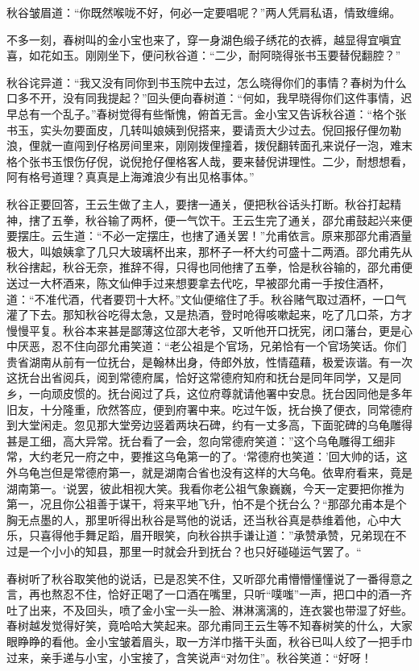 \documentclass[12pt,UTF8]{ctexbook}
\begin{document}
{{{秋谷皱眉道：“你既然喉咙不好，何必一定要唱呢？”两人凭肩私语，情致缠绵。

不多一刻，春树叫的金小宝也来了，穿一身湖色缎子绣花的衣裤，越显得宜嗔宜喜，如花如玉。刚刚坐下，便问秋谷道：“二少，耐阿晓得张书玉要替倪翻腔？”

秋谷诧异道：“我又没有同你到书玉院中去过，怎么晓得你们的事情？春树为什么口多不开，没有同我提起？”回头便向春树道：“何如，我早晓得你们这件事情，迟早总有一个乱子。”春树觉得有些惭愧，俯首无言。金小宝又告诉秋谷道：“格个张书玉，实头勿要面皮，几转叫娘姨到倪搭来，要请贡大少过去。倪回报仔俚勿勒浪，俚就一直闯到仔格房间里来，刚刚拨俚撞着，拨倪翻转面孔来说仔一泡，难末格个张书玉恨伤仔倪，说倪抢仔俚格客人哉，要来替倪讲理性。二少，耐想想看，阿有格号道理？真真是上海滩浪少有出见格事体。”

秋谷正要回答，王云生做了主人，要搳一通关，便把秋谷话头打断。秋谷打起精神，搳了五拳，秋谷输了两杯，便一气饮干。王云生完了通关，邵允甫鼓起兴来便要摆庄。云生道：“不必一定摆庄，也搳了通关罢！”允甫依言。原来那邵允甫酒量极大，叫娘姨拿了几只大玻璃杯出来，那杯子一杯大约可盛十二两酒。邵允甫先从秋谷搳起，秋谷无奈，推辞不得，只得也同他搳了五拳，恰是秋谷输的，邵允甫便送过一大杯酒来，陈文仙伸手过来想要拿去代吃，早被邵允甫一手按住酒杯，道：“不准代酒，代者要罚十大杯。”文仙便缩住了手。秋谷赌气取过酒杯，一口气灌了下去。那知秋谷吃得太急，又是热酒，登时呛得咳嗽起来，吃了几口茶，方才慢慢平复。秋谷本来甚是鄙薄这位邵大老爷，又听他开口抚宪，闭口藩台，更是心中厌恶，忍不住向邵允甫笑道：“老公祖是个官场，兄弟恰有一个官场笑话。你们贵省湖南从前有一位抚台，是翰林出身，侍郎外放，性情蕴藉，极爱诙谐。有一次这抚台出省阅兵，阅到常德府属，恰好这常德府知府和抚台是同年同学，又是同乡，一向顽皮惯的。抚台阅过了兵，这位府尊就请他署中安息。抚台因同他是多年旧友，十分隆重，欣然答应，便到府署中来。吃过午饭，抚台换了便衣，同常德府到大堂闲走。忽见那大堂旁边竖着两块石碑，约有一丈多高，下面驼碑的乌龟雕得甚是工细，高大异常。抚台看了一会，忽向常德府笑道：”这个乌龟雕得工细非常，大约老兄一府之中，要推这乌龟第一的了。‘常德府也笑道：’回大帅的话，这外乌龟岂但是常德府第一，就是湖南合省也没有这样的大乌龟。依卑府看来，竟是湖南第一。‘说罢，彼此相视大笑。我看你老公祖气象巍巍，今天一定要把你推为第一，况且你公祖善于谋干，将来平地飞升，怕不是个抚台么？“那邵允甫本是个胸无点墨的人，那里听得出秋谷是骂他的说话，还当秋谷真是恭维着他，心中大乐，只喜得他手舞足蹈，眉开眼笑，向秋谷拱手谦让道：”承赞承赞，兄弟现在不过是一个小小的知县，那里一时就会升到抚台？也只好碰碰运气罢了。“

春树听了秋谷取笑他的说话，已是忍笑不住，又听邵允甫懵懵懂懂说了一番得意之言，再也熬忍不住，恰好正喝了一口酒在嘴里，只听“噗嗤”一声，把口中的酒一齐吐了出来，不及回头，喷了金小宝一头一脸、淋淋漓漓的，连衣裳也带湿了好些。春树越发觉得好笑，竟哈哈大笑起来。邵允甫同王云生等不知春树笑的什么，大家眼睁睁的看他。金小宝皱着眉头，取一方洋巾揩干头面，秋谷已叫人绞了一把手巾过来，亲手递与小宝，小宝接了，含笑说声“对勿住”。秋谷笑道：“好呀！

}}}
\end{document}
